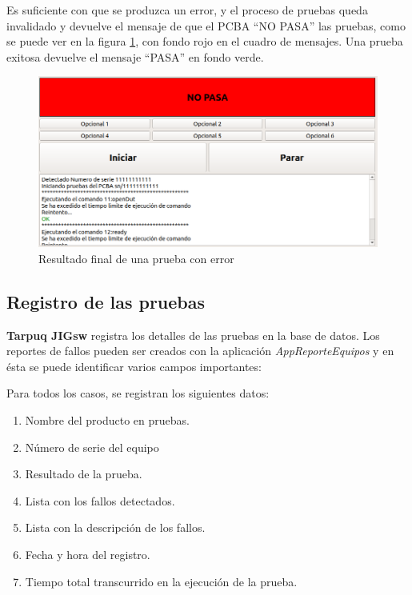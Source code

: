 \documentclass[a4paper,12pt]{refart}
\newcommand\tarpuqJIGsw{\textbf{Tarpuq JIGsw}}
\begin{document}
Es suficiente con que se produzca un error, y el proceso de pruebas queda invalidado y devuelve el mensaje de que el PCBA ``NO PASA'' las pruebas, como se puede ver en la figura \ref{fig:runningTest2}, con fondo rojo en el cuadro de mensajes. Una prueba exitosa devuelve el mensaje ``PASA'' en fondo verde.

\begin{figure}[hbt!]\centering
\includegraphics[width=\textwidth, frame]{images/running_test_error_2} 
\caption{Resultado final de una prueba con error}
\label{fig:runningTest2}
\end{figure}

\newpage

\subsection{Registro de las pruebas}
\tarpuqJIGsw{} registra los detalles de las pruebas en la base de datos. Los reportes de fallos pueden ser creados con la aplicación \emph{AppReporteEquipos} y en ésta se puede identificar varios campos importantes:

Para todos los casos, se registran los siguientes datos:

\begin{enumerate}
\item Nombre del producto en pruebas.
\item Número de serie del equipo
\item Resultado de la prueba.
\item Lista con los fallos detectados.
\item Lista con la descripción de los fallos.
\item Fecha y hora del registro.
\item Tiempo total transcurrido en la ejecución de la prueba.
\end{enumerate}
\end{document}
